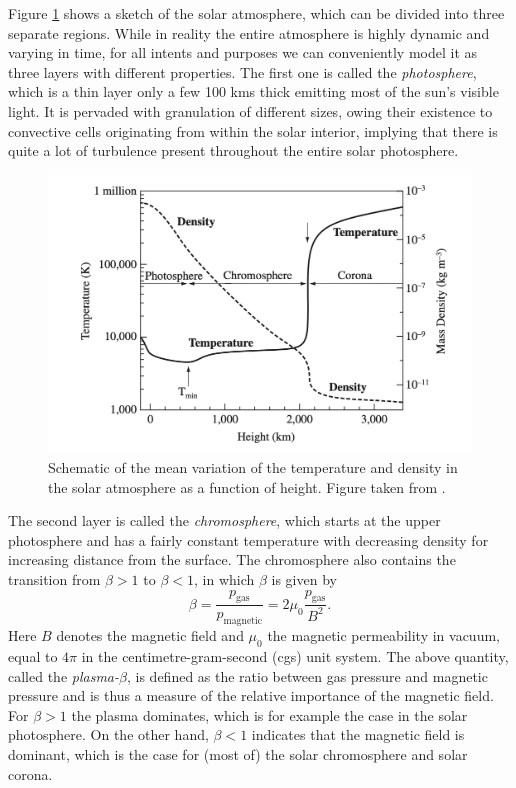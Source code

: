 Figure \ref{fig: solar_profile} shows a sketch of the solar atmosphere, which can be divided into three separate regions. While in reality the entire atmosphere is highly dynamic and varying in time, for all intents and purposes we can conveniently model it as three layers with different properties. The first one is called the \emph{photosphere}, which is a thin layer only a few 100 kms thick emitting most of the sun's visible light. It is pervaded with granulation of different sizes, owing their existence to convective cells originating from within the solar interior, implying that there is quite a lot of turbulence present throughout the entire solar photosphere.
\begin{figure}[t]
  \centering
  \includegraphics[width=\textwidth]{solar_profile.png}
  \caption{
    Schematic of the mean variation of the temperature and density in the solar atmosphere as a function of height.
    Figure taken from \citet{book_priest}.
  }
  \label{fig: solar_profile}
\end{figure}

The second layer is called the \emph{chromosphere}, which starts at the upper photosphere and has a fairly constant temperature with decreasing density for increasing distance from the surface. The chromosphere also contains the transition from $\beta > 1$ to $\beta < 1$, in which $\beta$ is given by
\begin{equation} \label{eq: plasma_beta}
  \beta = \frac{p_\text{gas}}{p_\text{magnetic}} = 2\mu_0 \frac{p_\text{gas}}{B^2}.
\end{equation}
Here $B$ denotes the magnetic field and $\mu_0$ the magnetic permeability in vacuum, equal to $4\pi$ in the centimetre-gram-second (cgs) unit system. The above quantity, called the \emph{plasma-$\beta$}, is defined as the ratio between gas pressure and magnetic pressure and is thus a measure of the relative importance of the magnetic field. For $\beta > 1$ the plasma dominates, which is for example the case in the solar photosphere. On the other hand, $\beta < 1$ indicates that the magnetic field is dominant, which is the case for (most of) the solar chromosphere and solar corona.

